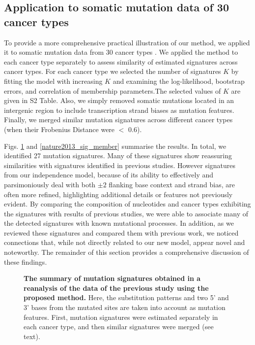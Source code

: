 \documentclass[10pt,letterpaper]{article}
\begin{document}
\subsection*{Application to somatic mutation data of 30 cancer types}
 
To provide a more comprehensive practical illustration of
our method, we applied it to somatic mutation data from 30 cancer types \cite{pmid23945592}.
We applied the method to each cancer type separately to assess similarity of estimated signatures across cancer types.
For each cancer type we selected the number of signatures $K$ by fitting the model with increasing $K$ and examining the log-likelihood, bootstrap errors, and correlation of membership parameters.The selected values of $K$ are given in S2 Table.
Also, we simply removed somatic mutations located in an intergenic region to include transcription strand biases as mutation features.
Finally, we merged similar mutation signatures across different cancer types 
(when their Frobenius Distance were $<$ $0.6$). 



Figs. \ref{nature2013_sig_summary} and \ref{nature2013_sig_member} summarise the results.
In total, we identified 27 mutation signatures.
Many of these signatures show reassuring similarities with
signatures identified in previous studies. However
signatures from our independence model, because of its ability to effectively
and parsimoniously deal with both $\pm2$ flanking
base context and strand bias, are often more refined, highlighting additional details or features not previously evident. By comparing the composition of nucleotides and cancer types exhibiting the signatures with results of previous studies, we were able to associate many of the detected signatures with known mutational processes.
In addition, as we reviewed these signatures
and compared them with previous work, we noticed connections
that, while not directly related to our new model, appear
novel and noteworthy. The remainder of this section
provides a comprehensive discussion of these findings.

\begin{figure}[h]
\centering
\caption{{\bf The summary of mutation signatures obtained in a reanalysis of the data of the previous study \cite{pmid23945592} using the proposed method.}
Here, the substitution patterns and two 5' and 3' bases from the mutated sites are taken into account as mutation features.
First, mutation signatures were estimated separately in each cancer type, and then similar signatures were merged (see text).
}
\label{nature2013_sig_summary}
\end{figure}
\end{document}
